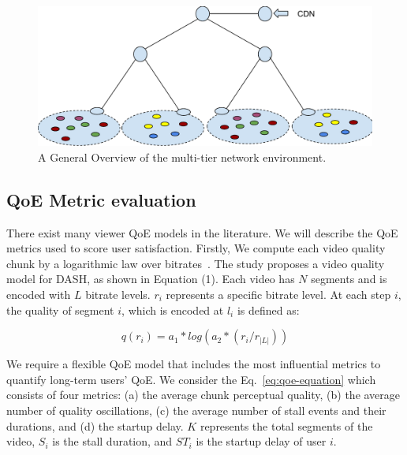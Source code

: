 \begin{figure}
    \centering
    \includegraphics[width=0.9\linewidth]{images/exp-setup-scenario.pdf}
    \caption{A General Overview of the multi-tier network environment.}
    \label{fig:exp-setup-scenario}
\end{figure}



\subsection{QoE Metric evaluation}

There exist many viewer QoE models in the literature. We will describe the QoE metrics used to score user satisfaction. Firstly, We compute each video quality chunk by a logarithmic law over bitrates~\cite{Reichl:TSys2013}. The study proposes a video quality model for DASH, as shown in Equation (1). Each video has $N$ segments and is encoded with $L$ bitrate levels. $r_i$ represents a specific bitrate level. At each step $i$, the quality of segment $i$, which is encoded at $l_i$ is defined as:

$$
q(r_i) = a_1 * log(a_2 * (r_i/ r_{|L|}))
$$

We require a flexible QoE model that includes the most influential metrics to quantify long-term users' QoE. 
We consider the Eq.~\ref{eq:qoe-equation} which consists of four metrics: (a) the average chunk perceptual quality, (b) the average number of quality oscillations, (c) the average number of stall events and their durations, and (d) the startup delay. $K$ represents the total segments of the video, $S_{i}$ is the stall duration, and $ST_{i}$ is the startup delay of user $i$.

